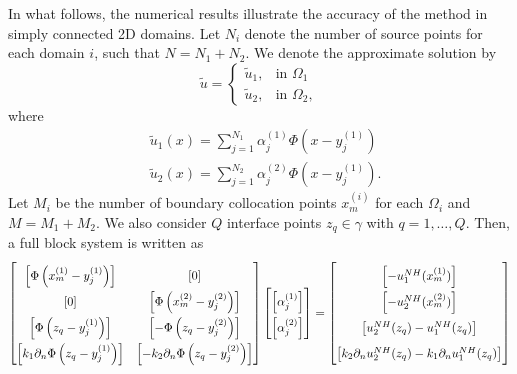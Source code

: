 In what follows, the numerical results illustrate the accuracy of the method in simply connected 2D domains. Let \(N_i\) denote the number of source points for each domain \(i\), such that \(N=N_1+N_2\). We denote the approximate solution by
\[
    \tilde{u} = \begin{cases}
        \tilde{u}_1, & \text{in } \Omega_1\\
        \tilde{u}_2, & \text{in } \Omega_2,
    \end{cases}
\]
where
\begin{align*}
    &\tilde{u}_1(x) = \sum_{j=1}^{N_1} \alpha^{(1)}_j \Phi\left(x-y_j^{(1)}\right)\\
    &\tilde{u}_2(x) = \sum_{j=1}^{N_2} \alpha^{(2)}_j \Phi\left(x-y_j^{(1)}\right).
\end{align*}
Let \(M_i\) be the number of boundary collocation points \(x^{(i)}_{m}\) for each \(\Omega_i\) and \(M=M_1+M_2\). We also consider \(Q\) interface points \(z_q \in \gamma\) with \(q=1,\dots,Q\). Then, a full block system is written as
\begin{equation}\label{mfs_transmission_classical_matrices_system}
    \renewcommand{\arraystretch}{1.75} %
    \begin{bmatrix}
        \left[\Phi\left(x^{(1)}_{m}-y_j^{(1)}\right)\right] & [0] \\
        [0] & \left[\Phi\left(x^{(2)}_{m}-y_j^{(2)}\right)\right] \\
        \left[\Phi\left(z_q-y_j^{(1)}\right)\right] & \left[-\Phi\left(z_q-y_j^{(2)}\right)\right] \\
        \left[k_1\partial_n \Phi\left(z_q-y_j^{(1)}\right)\right] & \left[-k_2 \partial_n \Phi\left(z_q-y_j^{(2)}\right)\right]
    \end{bmatrix}
    \begin{bmatrix}
        \left[\alpha^{(1)}_j\right]\\
        \left[\alpha^{(2)}_j\right]
    \end{bmatrix}=
    \begin{bmatrix}
        \left[-u_1^{NH}(x^{(1)}_{m})\right]\\
        \left[-u_2^{NH}(x^{(2)}_{m})\right]\\
        \left[u_2^{NH}(z_q)-u_1^{NH}(z_q)\right]\\
        \left[k_2 \partial_n u_2^{NH}(z_q)- k_1 \partial_n u_1^{NH}(z_q)\right]\\
    \end{bmatrix}
\end{equation}

